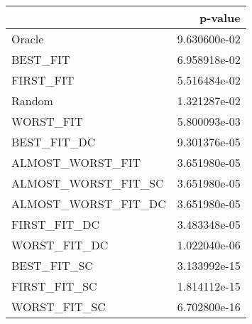 \begin{tabular}{lr}
\toprule
{} &       p-value \\
\midrule
Oracle               &  9.630600e-02 \\
 BEST\_FIT            &  6.958918e-02 \\
 FIRST\_FIT           &  5.516484e-02 \\
Random               &  1.321287e-02 \\
 WORST\_FIT           &  5.800093e-03 \\
 BEST\_FIT\_DC         &  9.301376e-05 \\
 ALMOST\_WORST\_FIT    &  3.651980e-05 \\
 ALMOST\_WORST\_FIT\_SC &  3.651980e-05 \\
 ALMOST\_WORST\_FIT\_DC &  3.651980e-05 \\
 FIRST\_FIT\_DC        &  3.483348e-05 \\
 WORST\_FIT\_DC        &  1.022040e-06 \\
 BEST\_FIT\_SC         &  3.133992e-15 \\
 FIRST\_FIT\_SC        &  1.814112e-15 \\
 WORST\_FIT\_SC        &  6.702800e-16 \\
\bottomrule
\end{tabular}
